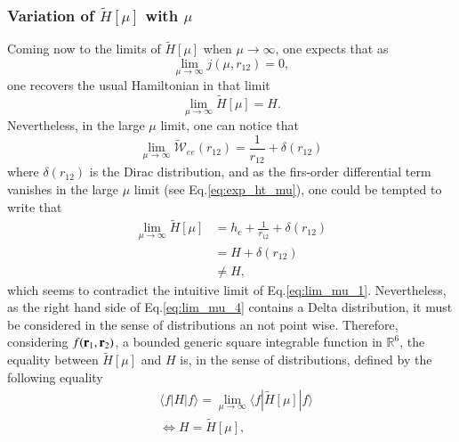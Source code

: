 \documentclass[aip,jcp,reprint,noshowkeys,superscriptaddress]{revtex4-1}
\newcommand{\matelem}[3]{\langle #1 | #2 | #3 \rangle}
\newcommand{\br}[0]{{\bf {r}}}
\newcommand{\R}{\mathbb{R}}
\begin{document}
\subsubsection{Variation of $\tilde{H}[\mu]$ with $\mu$}
\label{sec:h_mu_lim}
Coming now to the limits of $\tilde{H}[\mu]$ when $\mu \rightarrow \infty$, one expects that as
\begin{equation}
 \label{eq:lim_mu_0}
 \lim_{\mu  \rightarrow \infty }j(\mu,r_{12}) = 0, 
\end{equation}
one recovers the usual Hamiltonian in that limit
\begin{equation}
 \label{eq:lim_mu_1}
 \lim_{\mu \rightarrow \infty} \tilde{H}[\mu] = H.
\end{equation}
Nevertheless, in the large $\mu$ limit, one can notice that 
\begin{equation}
 \label{eq:lim_mu_3}
 \lim_{\mu \rightarrow \infty} \tilde{\mathcal{W}}_{ee}(r_{12})  = \frac{1}{r_{12}} + \delta(r_{12}) 
\end{equation}
where $\delta(r_{12})$ is the Dirac distribution, and as the firs-order differential term vanishes in the large $\mu$ limit (see Eq.\eqref{eq:exp_ht_mu}), one could be tempted to write that 
\begin{equation}
 \begin{aligned}
 \label{eq:lim_mu_4}
 \lim_{\mu \rightarrow \infty} \tilde{H}[\mu]& = h_c + \frac{1}{r_{12}} + \delta(r_{12}) \\
                                             & = H + \delta(r_{12})  \\
                                             & \ne H,
 \end{aligned}
\end{equation}
which seems to contradict the intuitive limit of Eq.\eqref{eq:lim_mu_1}. 
Nevertheless, as the right hand side of Eq.\eqref{eq:lim_mu_4} contains a Delta distribution, it must be considered in the sense of distributions an not point wise. 
Therefore, considering $f(\br{}_1,\br{}_2)$, a bounded generic square integrable function in $\R^6$, the equality between $\tilde{H}[\mu]$ and $H$ is, in the sense of distributions, defined by the following equality 
\begin{equation}
 \label{eq:lim_mu_5}
 \begin{aligned}
& \matelem{f}{H}{f} = \lim_{\mu \rightarrow \infty} \matelem{f}{\tilde{H}[\mu]}{f} \\
& \Leftrightarrow H = \tilde{H}[\mu],
 \end{aligned}
\end{equation}
\end{document}
